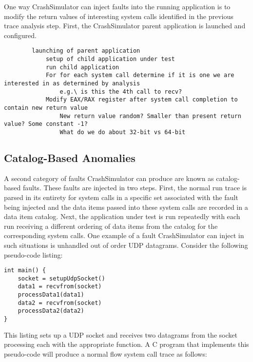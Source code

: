         One way CrashSimulator can inject faults into the running application is to
        modify the return values of interesting system calls identified in the previous trace analysis step. First, the
        CrashSimulator parent application is launched and configured.

        \begin{verbatim}
        launching of parent application
            setup of child application under test
            run child application
            For for each system call determine if it is one we are interested in as determined by analysis
                e.g.\ is this the 4th call to recv?
            Modify EAX/RAX register after system call completion to contain new return value
                New return value random? Smaller than present return value? Some constant -1?
                What do we do about 32-bit vs 64-bit
        \end{verbatim}

        \subsection{Catalog-Based Anomalies}

        A second category of faults CrashSimulator can produce are known as catalog-based faults. These faults are
        injected in two steps. First, the normal run trace is parsed in its entirety for system calls in a specific set
        associated with the fault being injected and the data items passed into these system calls are recorded in a
        data item catalog. Next, the application under test is run repeatedly with each run receiving a different
        ordering of data items from the catalog for the corresponding system calls. One example of a fault
        CrashSimulator can inject in such situations is unhandled out of order UDP datagrams. Consider the following
        pseudo-code listing:

        \begin{verbatim}
int main() {
    socket = setupUdpSocket()
    data1 = recvfrom(socket)
    processData1(data1)
    data2 = recvfrom(socket)
    processData2(data2)
}
        \end{verbatim}

        This listing sets up a UDP socket and receives two datagrams from the socket processing each with the
        appropriate function. A C program that implements this pseudo-code will produce a normal flow system call trace
        as follows:

